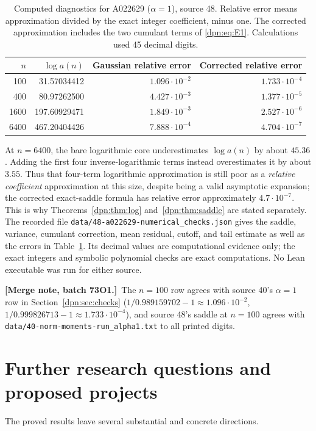 \documentclass[11pt]{article}
\numberwithin{equation}{section}
\theoremstyle{definition}\newtheorem{definition}[theorem]{Definition}
\theoremstyle{remark}\newtheorem{remark}[theorem]{Remark}
\newcommand{\mergenote}[1]{\par\smallskip\noindent\textbf{[Merge note, batch 73O1.]}\ #1\par\smallskip}
\newcommand{\file}[1]{\nolinkurl{#1}}
\begin{document}
\begin{table}[ht]
\centering\small
\begin{tabular}{r r r r}
\toprule
$n$ & $\log a(n)$ & Gaussian relative error & Corrected relative error\\
\midrule
100  & 31.57034412  & $1.096\cdot10^{-2}$ & $1.733\cdot10^{-4}$\\
400  & 80.97262500  & $4.427\cdot10^{-3}$ & $1.377\cdot10^{-5}$\\
1600 & 197.60929471 & $1.849\cdot10^{-3}$ & $2.527\cdot10^{-6}$\\
6400 & 467.20404426 & $7.888\cdot10^{-4}$ & $4.704\cdot10^{-7}$\\
\bottomrule
\end{tabular}
\caption{Computed diagnostics for A022629 ($\alpha=1$), source 48.  Relative
error means approximation divided by the exact integer coefficient, minus one.
The corrected approximation includes the two cumulant terms of
\eqref{dpn:eq:E1}.  Calculations used 45 decimal digits.}
\label{dpn:48:tab:numerics}
\end{table}

At $n=6400$, the bare logarithmic core underestimates $\log a(n)$ by about
$45.36$.  Adding the first four inverse-logarithmic terms instead
overestimates it by about $3.55$.  Thus that four-term logarithmic
approximation is still poor as a \emph{relative coefficient} approximation at
this size, despite being a valid asymptotic expansion; the corrected
exact-saddle formula has relative error approximately $4.7\cdot10^{-7}$.  This
is why Theorems~\ref{dpn:thm:log} and~\ref{dpn:thm:saddle} are stated
separately.  The recorded file \file{data/48-a022629-numerical_checks.json}
gives the saddle, variance, cumulant correction, mean residual, cutoff, and
tail estimate as well as the errors in Table~\ref{dpn:48:tab:numerics}.  Its
decimal values are computational evidence only; the exact integers and
symbolic polynomial checks are exact computations.  No Lean executable was
run for either source.
\mergenote{The $n=100$ row agrees with source 40's $\alpha=1$ row in
Section~\ref{dpn:sec:checks} ($1/0.989159702-1\approx1.096\cdot10^{-2}$,
$1/0.999826713-1\approx1.733\cdot10^{-4}$), and source 48's saddle at $n=100$
agrees with \file{data/40-norm-moments-run_alpha1.txt} to all printed
digits.}

\section{Further research questions and proposed projects}\label{dpn:sec:future}
The proved results leave several substantial and concrete directions.
\end{document}
